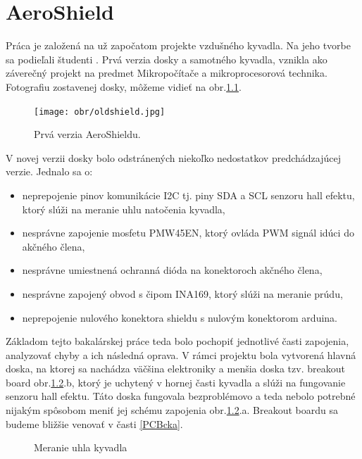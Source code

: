 \chapter{AeroShield}

Práca je založená na už započatom projekte vzdušného kyvadla. Na jeho tvorbe sa podieľali študenti . Prvá verzia dosky a samotného kyvadla, vznikla ako záverečný projekt na predmet Mikropočítače a mikroprocesorová technika. Fotografiu zostavenej dosky, môžeme vidieť na obr.\ref{OBRAZOK 2.1.1}.


\begin{figure}[tbh]
	\centering
	\texttt{[image: obr/oldshield.jpg]}
	\caption{Prvá verzia AeroShieldu. }\label{OBRAZOK 2.1.1}
\end{figure}


V novej verzii dosky bolo odstránených niekoľko nedostatkov predchádzajúcej verzie. Jednalo sa o:

\begin{itemize}
	\item neprepojenie pinov komunikácie I2C tj. piny SDA a SCL senzoru hall efektu, ktorý slúži na meranie uhlu natočenia kyvadla,
	\item nesprávne zapojenie mosfetu PMW45EN, ktorý ovláda PWM signál idúci do akčného člena,
	\item nesprávne umiestnená ochranná dióda na konektoroch akčného člena,
	\item nesprávne zapojený obvod s čipom INA169, ktorý slúži na meranie prúdu,
	\item neprepojenie nulového konektora shieldu s nulovým konektorom arduina.
\end{itemize}

Základom tejto bakalárskej práce teda bolo pochopiť jednotlivé časti zapojenia, analyzovať chyby a ich následná oprava. V rámci projektu bola vytvorená hlavná doska, na ktorej sa nachádza väčšina elektroniky a menšia doska tzv. breakout board obr.\ref{OBRAZOK 2.1.2}.b, ktorý je uchytený v hornej časti kyvadla a slúži na fungovanie senzoru hall efektu. Táto doska fungovala bezproblémovo a teda nebolo potrebné nijakým spôsobom meniť jej schému zapojenia obr.\ref{OBRAZOK 2.1.2}.a. Breakout boardu sa budeme bližšie venovať v časti \ref{PCBcka}.

\begin{figure}[!tbh]
	\hfill
	\hfill
	\hfill
	\caption{Meranie uhla kyvadla}\label{OBRAZOK 2.1.2}
\end{figure}


